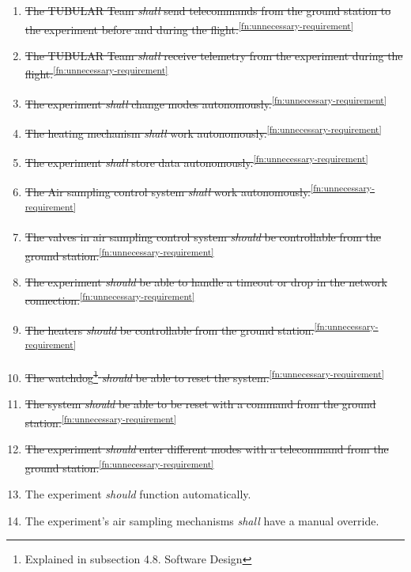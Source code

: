 \documentclass[a4paper,12pt,twoside]{article}
\begin{document}
\begin{enumerate}[label=O.\arabic*]
    \item \st{The TUBULAR Team \textit{shall} send telecommands from the ground station to the experiment before and during the flight.}\textsuperscript{\ref{fn:unnecessary-requirement}}
    \item \st{The TUBULAR Team \textit{shall} receive telemetry from the experiment during the flight.}\textsuperscript{\ref{fn:unnecessary-requirement}}
    \item \st{The experiment \textit{shall} change modes autonomously.}\textsuperscript{\ref{fn:unnecessary-requirement}}
    \item \st{The heating mechanism \textit{shall} work autonomously.}\textsuperscript{\ref{fn:unnecessary-requirement}}
    \item \st{The experiment \textit{shall} store data autonomously.}\textsuperscript{\ref{fn:unnecessary-requirement}}
    \item \st{The Air sampling control system \textit{shall} work autonomously.}\textsuperscript{\ref{fn:unnecessary-requirement}}
    \item \st{The valves in air sampling control system \textit{should} be controllable from the ground station.}\textsuperscript{\ref{fn:unnecessary-requirement}}
    \item \st{The experiment \textit{should} be able to handle a timeout or drop in the network connection.}\textsuperscript{\ref{fn:unnecessary-requirement}}
    \item \st{The heaters \textit{should} be controllable from the ground station.}\textsuperscript{\ref{fn:unnecessary-requirement}}
    \item \st{The watchdog\footnote{Explained in subsection 4.8. Software Design} \textit{should} be able to reset the system.}\textsuperscript{\ref{fn:unnecessary-requirement}}
    \item \st{The system \textit{should} be able to be reset with a command from the ground station.}\textsuperscript{\ref{fn:unnecessary-requirement}}
    \item \st{The experiment \textit{should} enter different modes with a telecommand from the ground station.}\textsuperscript{\ref{fn:unnecessary-requirement}}
    \item The experiment \textit{should} function automatically.
    \item The experiment's air sampling mechanisms \textit{shall} have a manual override.
\end{enumerate} 
\pagebreak
\end{document}
